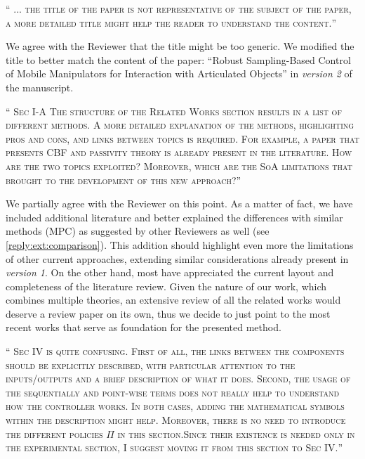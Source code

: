\documentclass[10pt]{article}
\newcommand{\referee}[1]{\;
  \begin{minipage}[t]{.95\textwidth}
    ``{\small\color{red} \textsc{#1}}''
  \end{minipage}\medskip
  }
\newcommand{\version}[1]{\textit{version #1}}
\begin{document}
\begin{enumerate}[label={[R7:\,\arabic{enumi}]}]
\item\label{reply:R7:12} 
\referee{... the title of the paper is not representative of the subject of the paper, a more detailed title might help the reader to understand the content.}

We agree with the Reviewer that the title might be too generic. We modified the title to better match the content of the paper: “Robust Sampling-Based Control of Mobile Manipulators for Interaction with Articulated Objects” in \version{2} of the manuscript. 

\item\label{reply:R7:13} 
\referee{Sec I-A The structure of the Related Works section results in a list of different methods. A more detailed explanation of the methods, highlighting pros and cons, and links between topics is required. For example, a paper that presents CBF and passivity theory is already present in the literature. How are the two topics exploited? Moreover, which are the SoA limitations that brought to the development of this new approach?}

We partially agree with the Reviewer on this point. As a matter of fact, we have included additional literature and better explained the differences with similar methods (MPC) as suggested by other Reviewers as well (see \ref{reply:ext:comparison}). This addition should highlight even more the limitations of other current approaches, extending similar considerations already present in \version{1}. On the other hand, most have appreciated the current layout and completeness of the literature review. Given the nature of our work, which combines multiple theories, an extensive review of all the related works would deserve a review paper on its own, thus we decide to just point to the most recent works that serve as foundation for the presented method.


\item\label{reply:R7:14} 
\referee{Sec IV is quite confusing. First of all, the links between the components should be explicitly described, with particular attention to the inputs/outputs and a brief description of what it does. Second, the usage of the  sequentially and point-wise terms does not really help to understand how the controller works. In both cases, adding the mathematical symbols within the description might help. Moreover, there is no need to introduce the different policies $\Pi$ in this section.Since their existence is needed only in the experimental section, I suggest moving it from this section to Sec IV.}


\end{enumerate}
\end{document}
